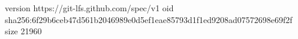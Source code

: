 version https://git-lfs.github.com/spec/v1
oid sha256:6f29b6ceb47d561b2046989e0d5ef1eae85793d1f1ed9208ad07572698e69f2f
size 21960
